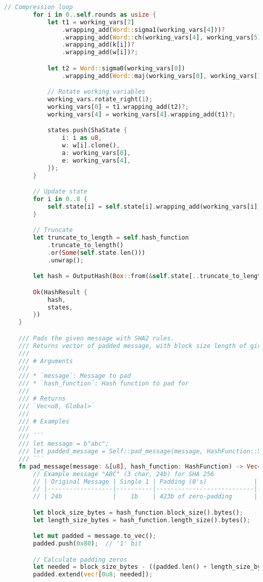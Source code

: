 \begin{lstlisting}[language=rust, caption={sha/sha.rs}]
		// Compression loop
		for i in 0..self.rounds as usize {
			let t1 = working_vars[7]
				.wrapping_add(Word::sigma1(working_vars[4]))?
				.wrapping_add(Word::ch(working_vars[4], working_vars[5], working_vars[6])?)?
				.wrapping_add(k[i])?
				.wrapping_add(w[i])?;

			let t2 = Word::sigma0(working_vars[0])
				.wrapping_add(Word::maj(working_vars[0], working_vars[1], working_vars[2])?)?;

			// Rotate working variables
			working_vars.rotate_right(1);
			working_vars[0] = t1.wrapping_add(t2)?;
			working_vars[4] = working_vars[4].wrapping_add(t1)?;

			states.push(ShaState {
				i: i as u8,
				w: w[i].clone(),
				a: working_vars[0],
				e: working_vars[4],
			});
		}

		// Update state
		for i in 0..8 {
			self.state[i] = self.state[i].wrapping_add(working_vars[i])?;
		}

		// Truncate
		let truncate_to_length = self.hash_function
			.truncate_to_length()
			.or(Some(self.state.len()))
			.unwrap();

		let hash = OutputHash(Box::from(&self.state[..truncate_to_length]));

		Ok(HashResult {
			hash,
			states,
		})
	}

	/// Pads the given message with SHA2 rules.
	/// Returns vector of padded message, with block size length of given hash function.
	///
	/// # Arguments
	///
	/// * `message`: Message to pad
	/// * `hash_function`: Hash function to pad for
	///
	/// # Returns
	/// `Vec<u8, Global>`
	///
	/// # Examples
	///
	/// ```
	/// let message = b"abc";
	/// let padded_message = Self::pad_message(message, HashFunction::SHA256);
	/// ```
	fn pad_message(message: &[u8], hash_function: HashFunction) -> Vec<u8> {
		// Example message "ABC" (3 char, 24b) for SHA 256
		// | Original Message | Single 1 | Padding (0's)             | Length (64b)          |
		// |------------------|----------|---------------------------|-----------------------|
		// | 24b              |    1b    | 423b of zero-padding      | 64b representing "24" |

		let block_size_bytes = hash_function.block_size().bytes();
		let length_size_bytes = hash_function.length_size().bytes();

		let mut padded = message.to_vec();
		padded.push(0x80);  // '1' bit

		// Calculate padding zeros
		let needed = block_size_bytes - ((padded.len() + length_size_bytes) % block_size_bytes);
		padded.extend(vec![0u8; needed]);


\end{lstlisting}
